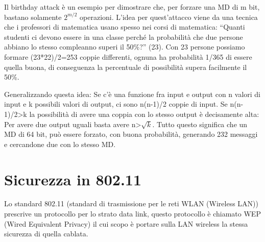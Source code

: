 Il birthday attack è un esempio per dimostrare che, per forzare una MD di m bit, bastano solamente $2^{m/2}$ operazioni. L’idea per quest’attacco viene da una tecnica che i professori di matematica usano spesso nei corsi di matematica: “Quanti studenti ci devono essere in una classe perché la probabilità che due persone abbiano lo stesso compleanno superi il 50\%?” (23).
Con 23 persone possiamo formare (23*22)/2=253 coppie differenti, ognuna ha probabilità 1/365 di essere quella buona, di conseguenza la percentuale di possibilità supera facilmente il 50\%.

Generalizzando questa idea: Se c’è una funzione fra input e output con n valori di input e k possibili valori di output, ci sono n(n-1)/2 coppie di input. Se n(n-1)/2>k la possibilità di avere una coppia con lo stesso output è decisamente alta: Per avere due output uguali basta avere n>$\sqrt{k}$.
Tutto questo significa che un MD di 64 bit, può essere forzato, con buona probabilità, generando 232 messaggi e cercandone due con lo stesso MD.

\section{Sicurezza in 802.11}

Lo standard 802.11 (standard di trasmissione per le reti WLAN (Wireless LAN)) prescrive un protocollo per lo strato data link, questo protocollo è chiamato WEP (Wired Equivalent Privacy) il cui scopo è portare sulla LAN wireless la stessa sicurezza di quella cablata.

